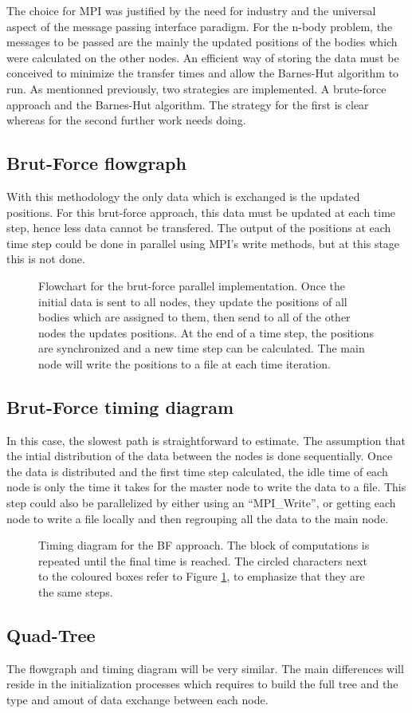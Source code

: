 The choice for MPI was justified by the need for industry and the universal aspect of the message passing interface paradigm. For the n-body problem, the messages to be passed are the mainly the updated positions of the bodies which were calculated on the other nodes. An efficient way of storing the data must be conceived to minimize the transfer times and allow the Barnes-Hut algorithm to run. As mentionned previously, two strategies are implemented. A brute-force approach and the Barnes-Hut algorithm. The strategy for the first is clear whereas for the second further work needs doing.
\subsection{Brut-Force flowgraph} With this methodology the only data which is exchanged is the updated positions. For this brut-force approach, this data must be updated at each time step, hence less data cannot be transfered. The output of the positions at each time step could be done in parallel using MPI's write methods, but at this stage this is not done. 
\begin{figure}[H]
\centering
{}
\caption{Flowchart for the brut-force parallel implementation. Once the initial data is sent to all nodes, they update the positions of all bodies which are assigned to them, then send to all of the other nodes the updates positions. At the end of a time step, the positions are synchronized and a new time step can be calculated. The main node will write the positions to a file at each time iteration.}
\label{fig:flow_chart_bf}
\end{figure}

\subsection{Brut-Force timing diagram}
In this case, the slowest path is straightforward to estimate. The assumption that the intial distribution of the data between the nodes is done sequentially. Once the data is distributed and the first time step calculated, the idle time of each node is only the time it takes for the master node to write the data to a file. This step could also be parallelized by either using an ``MPI\_Write'', or getting each node to write a file locally and then regrouping all the data to the main node. 
\begin{figure}[H]
\centering
{}
\caption{Timing diagram for the BF approach. The block of computations is repeated until the final time is reached. The circled characters next to the coloured boxes refer to Figure \ref{fig:flow_chart_bf}, to emphasize that they are the same steps.}
\label{fig:timing_bf}
\end{figure} 

\subsection{Quad-Tree}
The flowgraph and timing diagram will be very similar. The main differences will reside in the initialization processes which requires to build the full tree and the type and amout of data exchange between each node. 
